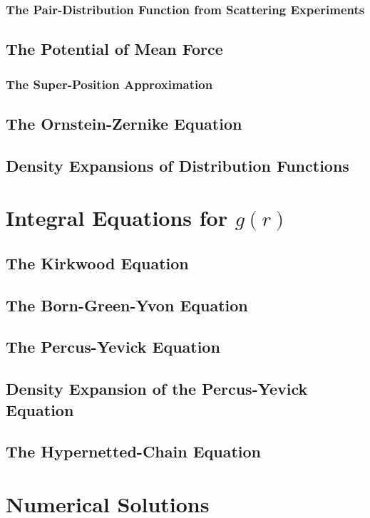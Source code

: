 \documentclass[a4paper,11pt]{article}
\begin{document}
\subsubsection{The Pair-Distribution Function from Scattering Experiments}
\subsection{The Potential of Mean Force}
\subsubsection{The Super-Position Approximation}
\subsection{The Ornstein-Zernike Equation}
\subsection{Density Expansions of Distribution Functions}

\newpage
\section{Integral Equations for $g(r)$}\label{sec:integral}

\subsection{The Kirkwood Equation}\label{ssec:kirkwood}

\subsection{The Born-Green-Yvon Equation}\label{ssec:born}
\subsection{The Percus-Yevick Equation}
\subsection{Density Expansion of the Percus-Yevick Equation}
\subsection{The Hypernetted-Chain Equation}

\section{Numerical Solutions}
\end{document}
